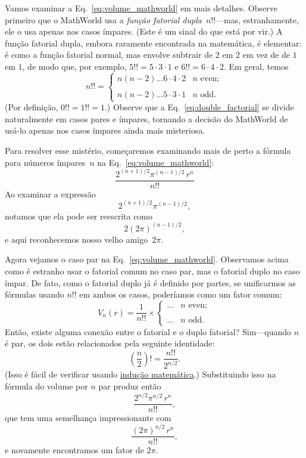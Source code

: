 {Vamos examinar a Eq.~\eqref{eq:volume_mathworld} em mais detalhes. Observe primeiro que o MathWorld usa a \emph{função fatorial dupla}~$n!!$---mas, estranhamente, ele o usa apenas nos casos ímpares. (Este é um sinal do que está por vir.) A função fatorial dupla, embora raramente encontrada na matemática, é elementar: é como a função fatorial normal, mas envolve subtrair de $2$ em $2$ em vez de de $1$ em $1$, de modo que, por exemplo, $5!! = 5 \cdot 3 \cdot 1$ e $6!! = 6 \cdot 4 \cdot 2$. Em geral, temos
\begin{equation}
\label{eq:double_factorial}
n!! = \begin{cases}
n(n-2)\ldots6\cdot4\cdot2 & n \text{ even}; \\ \\
n(n-2)\ldots5\cdot3\cdot1 & n \text{ odd}.
\end{cases}
\end{equation}
(Por definição, $0!! = 1!! = 1$.) Observe que a Eq.~\eqref{eq:double_factorial} se divide naturalmente em casos pares e ímpares, tornando a decisão do MathWorld de usá-lo apenas nos casos ímpares ainda mais misteriosa.

Para resolver esse mistério, começaremos examinando mais de perto a fórmula para números ímpares~$n$ na Eq.~\eqref{eq:volume_mathworld}:
\[ \frac{2^{(n+1)/2}\pi^{(n-1)/2}\,r^n}{n!!} \]
Ao examinar a expressão
\[ 2^{(n+1)/2}\pi^{(n-1)/2}, \]
notamos que ela pode ser reescrita como
\[ 2(2\pi)^{(n-1)/2}, \]
e aqui reconhecemos nosso velho amigo~$2\pi$.

Agora vejamos o caso par na Eq.~\eqref{eq:volume_mathworld}. Observamos acima como é estranho usar o fatorial comum no caso par, mas o fatorial duplo no caso ímpar. De fato, como o fatorial duplo já é definido por partes, se unificarmos as fórmulas usando $n!!$ em ambos os casos, poderíamos  como um fator comum:
\[
V_n(r) = \frac{1}{n!!}\times \begin{cases}
\ldots & n \text{ even}; \\ \\
 \ldots & n \text{ odd}.
 \end{cases}
\]
Então, existe alguma conexão entre o fatorial e o duplo fatorial? Sim---quando $n$ é par, os dois estão relacionados pela seguinte identidade:
\[ \left(\frac{n}{2}\right)! = \frac{n!!}{2^{n/2}}. \]
(Isso é fácil de verificar usando \href{https://pt.wikipedia.org/wiki/Indu%C3%A7%C3%A3o_matem%C3%A1tica}{indução matemática}.) Substituindo isso na fórmula do volume por $n$ par produz então
\[ \frac{2^{n/2}\pi^{n/2}\,r^n}{n!!}, \]
que tem uma semelhança impressionante com
\[ \frac{(2\pi)^{n/2}\,r^n}{n!!}, \]
e novamente encontramos um fator de $2\pi$.

}
